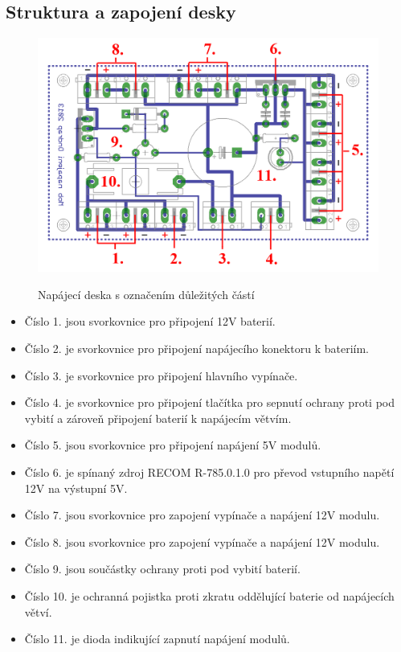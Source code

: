 \documentclass[a4paper,11pt]{article}
\begin{document}
\newpage
\subsection{Struktura a zapojení desky}

\begin{figure}[htbp]
	\centering
		\includegraphics{napajeniMobDeskaOznacena.png}
	\label{fig:napajeniMobDeskaOznacena}
	\caption{Napájecí deska s označením důležitých částí}
\end{figure}


\begin{itemize}
	\item Číslo 1. jsou svorkovnice pro připojení 12V baterií. 
	\item Číslo 2. je svorkovnice pro připojení napájecího konektoru k bateriím.
	\item Číslo 3. je svorkovnice pro připojení hlavního vypínače.
	\item Číslo 4. je svorkovnice pro připojení tlačítka pro sepnutí ochrany proti pod vybití a zároveň připojení baterií k napájecím větvím.
	\item Číslo 5. jsou svorkovnice pro připojení napájení 5V modulů.
	\item Číslo 6. je spínaný zdroj RECOM R-785.0.1.0 pro převod vstupního napětí 12V na výstupní 5V.
	\item Číslo 7. jsou svorkovnice pro zapojení vypínače a napájení 12V modulu.
	\item Číslo 8. jsou svorkovnice pro zapojení vypínače a napájení 12V modulu.
	\item Číslo 9. jsou součástky ochrany proti pod vybití baterií.
	\item Číslo 10. je ochranná pojistka proti zkratu oddělující baterie od napájecích větví.
	\item Číslo 11. je dioda indikující zapnutí napájení modulů.
\end{itemize}
\end{document}
